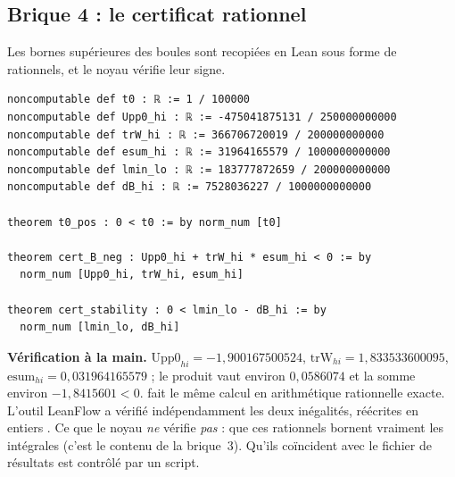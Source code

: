\subsection{Brique 4 : le certificat rationnel}\label{ch3:sec:certificat}
Les bornes supérieures des boules sont recopiées en Lean sous forme de rationnels, et le noyau vérifie leur signe.
\begin{leanbox}
\begin{lstlisting}[style=chIIIlean]
noncomputable def t0 : ℝ := 1 / 100000
noncomputable def Upp0_hi : ℝ := -475041875131 / 250000000000
noncomputable def trW_hi : ℝ := 366706720019 / 200000000000
noncomputable def esum_hi : ℝ := 31964165579 / 1000000000000
noncomputable def lmin_lo : ℝ := 183777872659 / 200000000000
noncomputable def dB_hi : ℝ := 7528036227 / 1000000000000

theorem t0_pos : 0 < t0 := by norm_num [t0]

theorem cert_B_neg : Upp0_hi + trW_hi * esum_hi < 0 := by
  norm_num [Upp0_hi, trW_hi, esum_hi]

theorem cert_stability : 0 < lmin_lo - dB_hi := by
  norm_num [lmin_lo, dB_hi]
\end{lstlisting}
\end{leanbox}
\noindent \textbf{Vérification à la main.} $\mathrm{Upp0}_{hi}=-1{,}900167500524$, $\mathrm{trW}_{hi}=1{,}833533600095$,
$\mathrm{esum}_{hi}=0{,}031964165579$ ; le produit vaut environ $0{,}0586074$ et la somme environ $-1{,}8415601<0$.
 fait le même calcul en arithmétique rationnelle exacte. L'outil LeanFlow  a
vérifié indépendamment les deux inégalités, réécrites en entiers \tierAs. Ce que le noyau \emph{ne} vérifie \emph{pas} :
que ces rationnels bornent vraiment les intégrales (c'est le contenu \tierC{} de la brique~3). Qu'ils coïncident avec le
fichier de résultats est contrôlé par un script.

